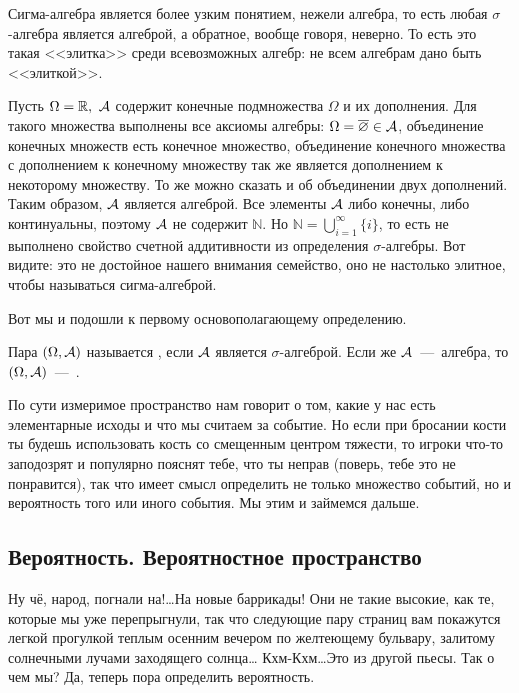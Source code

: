 \documentclass[../TV&MS.tex]{subfiles}
\begin{document}
Сигма-алгебра является более узким понятием, нежели алгебра, то есть любая 
$\sigma$-алгебра является алгеброй, а обратное, вообще говоря, неверно.
То есть это такая <<элитка>> среди всевозможных алгебр: не всем алгебрам
дано быть <<элиткой>>.

\begin{Ex}
	Пусть $\Omega = \mathbb{R},\  \mathcal{A}$ содержит конечные подмножества $\Omega$ и их дополнения. 
	Для такого множества выполнены все аксиомы алгебры: $\Omega = \overline{\varnothing} \in \mathcal{A}$,
	объединение конечных множеств есть конечное множество, объединение конечного множества с 
	дополнением к конечному множеству так же является дополнением к некоторому множеству. 
	То же можно сказать и об объединении двух дополнений. Таким образом, $\mathcal{A}$ является алгеброй.
	Все элементы $\mathcal{A}$ либо конечны, либо континуальны, поэтому $\mathcal{A}$ не содержит $\mathbb{N}$. 
	Но $\mathbb{N} = \bigcup\limits_{i=1}^{\infty}\{i\}$, то есть не выполнено свойство счетной 
	аддитивности из определения $\sigma$-алгебры. Вот видите: это не достойное нашего внимания семейство,
	оно не настолько элитное, чтобы называться сигма-алгеброй.
\end{Ex}

	Вот мы и подошли к первому основополагающему определению.

\begin{Def}
	Пара $(\Omega, \mathcal{A})$ называется , если $\mathcal{A}$ является 
	$\sigma$-алгеброй. Если же $\mathcal{A}$~---~алгебра, то  $(\Omega, \mathcal{A})$~---~.
\end{Def}

По сути измеримое пространство нам говорит о том, какие у нас есть элементарные исходы 
и что мы считаем за событие. Но если при бросании кости ты будешь использовать кость 
со смещенным центром тяжести, то игроки что-то заподозрят и популярно пояснят тебе, что ты неправ
(поверь, тебе это не понравится), так что имеет смысл определить не только множество событий, 
но и вероятность того или иного события. Мы этим и займемся дальше.

\subsection{Вероятность. Вероятностное пространство}
	
\qquad Ну чё, народ, погнали на!\dots На новые баррикады! Они не такие высокие, как те, 
которые мы уже перепрыгнули, так что следующие пару страниц вам покажутся легкой прогулкой
теплым осенним вечером по желтеющему бульвару, залитому солнечными лучами заходящего солнца\dots
Кхм-Кхм\dots Это из другой пьесы. Так о чем мы? Да, теперь пора определить вероятность.
\end{document}
